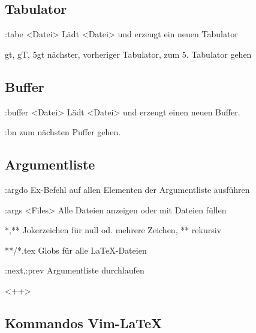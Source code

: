 \documentclass{scrartcl}
\begin{document}
\begin{multicols}{2}
\begin{description*}
\end{description*}

\subsection*{Tabulator}

  \begin{description*}

    \item[:tabe <Datei>] Lädt <Datei> und erzeugt ein neuen Tabulator
    \item[gt, gT, 5gt] nächster, vorheriger Tabulator, zum 5. Tabulator gehen

  \end{description*}

\subsection*{Buffer}

\begin{description*}

  \item[:buffer <Datei>] Lädt <Datei> und erzeugt einen neuen Buffer.
  \item[:bn] zum nächsten Puffer gehen.

\end{description*}

\subsection*{Argumentliste}

\begin{description*}

	\item[:argdo] Ex-Befehl auf allen Elementen der Argumentliste ausführen
	\item[:args <Files>] Alle Dateien anzeigen oder mit Dateien füllen
	\item[*,**] Jokerzeichen für null od. mehrere Zeichen, ** rekursiv
	\item[**/*.tex] Globs für alle LaTeX-Dateien
	\item[:next,:prev] Argumentliste durchlaufen
\end{description*}<++>
\subsection*{Kommandos Vim-LaTeX}

\begin{description*}


\end{description*}
\end{multicols}
\end{document}
